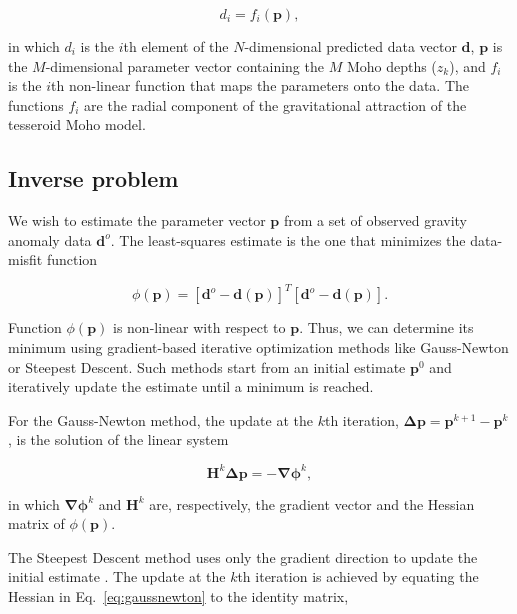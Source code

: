 \documentclass[extra]{gji}
\begin{document}
\begin{equation}
    d_i = f_i(\mathbf{p}),
    \label{eq:forward}
\end{equation}

\noindent in which $d_i$ is the $i$th element of the $N$-dimensional predicted
data vector $\mathbf{d}$, $\mathbf{p}$ is the $M$-dimensional parameter vector
containing the $M$ Moho depths ($z_k$),
and $f_i$ is the $i$th non-linear function that maps the parameters onto the
data.
The functions $f_i$ are the radial component of the gravitational attraction
of the tesseroid Moho model.



\subsection{Inverse problem}

We wish to estimate the parameter vector $\mathbf{p}$ from a set of observed
gravity anomaly data $\mathbf{d}^o$.
The least-squares estimate is the one that minimizes the data-misfit function

\begin{equation}
    \phi(\mathbf{p}) =
    [\mathbf{d}^o - \mathbf{d}(\mathbf{p})]^T[\mathbf{d}^o - \mathbf{d}(\mathbf{p})].
    \label{eq:data-misfit}
\end{equation}

Function $\phi(\mathbf{p})$ is non-linear with respect to $\mathbf{p}$.
Thus, we can determine its minimum using gradient-based
iterative optimization
methods like Gauss-Newton or Steepest Descent.
Such methods start from an initial estimate $\mathbf{p}^0$ and iteratively
update the estimate until a minimum is reached.

For the Gauss-Newton method,
the update at the $k$th iteration,
$\mathbf{\Delta p} = \mathbf{p}^{k+1} - \mathbf{p}^k$,
is the solution of the linear system

\begin{equation}
    \mathbf{H}^k\mathbf{\Delta p} = -\mathbf{\nabla\phi}^k,
    \label{eq:gaussnewton}
\end{equation}

\noindent in which
$\mathbf{\nabla\phi}^k$ and $\mathbf{H}^k$ are, respectively,
the gradient vector and the Hessian matrix of $\phi(\mathbf{p})$.

The Steepest Descent method uses only the gradient direction
to update the initial estimate \citep{kelley1987}.
The update at the $k$th iteration is achieved by equating the Hessian
in Eq.~\ref{eq:gaussnewton} to the identity matrix,
\end{document}
